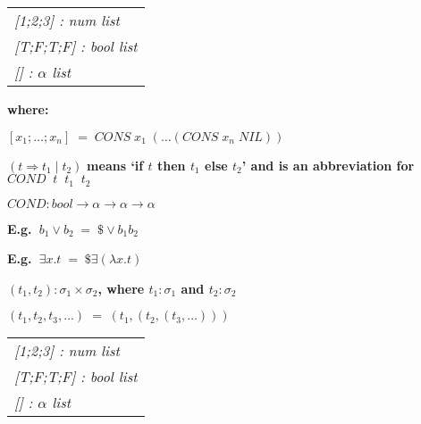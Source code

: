 \vskip 5mm
\bspindent\LARGE
\begin{tabular}{l}
{\em [1;2;3] : num list}\\[2mm]
{\em [T;F;T;F] : bool list}\\[2mm]
{\em [] : $\alpha$ list}
\end{tabular}
\espindent\vskip5mm
\bpindent\LARGE\bf
where:
\epindent
\vskip5mm

\bspindent\LARGE
 $[x_1;\dots;x_n]\;=\; CONS\;x_1\;(\dots (CONS\;x_n\;NIL))$
\espindent



\vskip5mm
\bspindent\LARGE
{\( (t \Rightarrow t_1 \mid t_2) \)}
\espindent
\vskip5mm
\bpindent\LARGE\bf means\epindent
\vskip5mm
\bspindent\LARGE\bf
`if $t$ then $t_1$ else $t_2$'
\espindent
\vskip5mm
\bpindent\LARGE\bf and is an abbreviation for\epindent
\vskip5mm
\bspindent\LARGE\bf
$COND\;\;t\;\;t_1\;\;t_2$
\espindent
\vskip7mm

\vskip 5mm
\bspindent\LARGE
{$COND:bool \rightarrow \alpha \rightarrow \alpha \rightarrow \alpha$}
\espindent



\vskip5mm
\bspindent\LARGE\bf
E.g.\ \( b_1 \vee b_2 \;=\; \$\vee b_1 b_2 \)
\espindent

\vskip5mm
\bspindent\LARGE\bf
E.g.\ \( \exists x.t  \;=\;  \$\exists(\lambda x.t) \)
\espindent

\vskip5mm
\bspindent\LARGE\bf
$(t_1, t_2): \sigma_1 \times \sigma_2$, where $t_1{:}\sigma_1$ and
$t_2{:}\sigma_2$
\espindent

\vskip 5mm

\bspindent\LARGE
$(t_1, t_2, t_3,\ldots) \;=\; (t_1, (t_2, (t_3, \ldots )))$
\espindent

\vskip 5mm
\bspindent\LARGE
\begin{tabular}{@{}l}
{\em [1;2;3] : num list}\\[2mm]
{\em [T;F;T;F] : bool list}\\[2mm]
{\em [] : $\alpha$ list}
\end{tabular}
\espindent


